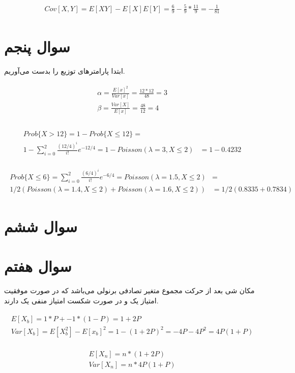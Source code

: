 \documentclass[paper=a4, fontsize=11pt]{article}
\numberwithin{equation}{section} %
\numberwithin{figure}{section} %
\numberwithin{table}{section} %
\begin{document}
\begin{align}
\begin{split}
    Cov[X,Y] = E[XY] - E[X]E[Y] = \frac{6}{9} - \frac{5}{9} * \frac{11}{9} = -\frac{1}{81}
\end{split}
\end{align}

\section{سوال پنجم}
ابتدا پارامتر‌های توزیع را بدست می‌آوریم.

\begin{align}
\begin{split}
    \alpha = \frac{E[x]^2}{Var[x]} = \frac{12 * 12}{48} = 3\\
    \beta = \frac{Var[X]}{E[x]} = \frac{48}{12} = 4\\
\end{split}
\end{align}

\begin{align}
\begin{split}
    Prob\{X > 12\} = 1 - Prob\{X \le 12\} =&\\
    1 - \sum_{i=0}^{2} \frac{(12/4)^i}{i!} e^{-12/4} = 1 - Poisson(\lambda = 3, X \le 2)
    &= 1 - 0.4232
\end{split}
\end{align}

\begin{align}
\begin{split}
    Prob\{X \le 6\} = \sum_{i=0}^{2} \frac{(6/4)^i}{i!} e^{-6/4} = Poisson(\lambda = 1.5, X \le 2) &=\\
    1/2 (Poisson(\lambda = 1.4, X \le 2) + Poisson(\lambda = 1.6, X \le 2)) &= 1/2(0.8335 + 0.7834)
\end{split}
\end{align}

\section{سوال ششم}

\section{سوال هفتم}

مکان شی بعد از 
حرکت مجموع 
متغیر تصادفی برنولی می‌باشد که
در صورت موفقیت امتیاز یک و در صورت شکست امتیاز منفی یک دارند.

\begin{align}
\begin{split}
    E[X_b] = 1 * P + -1 * (1 - P) =  1 + 2P\\
    Var[X_b] = E[X_b^2] - E[x_b]^2 = 1 - (1 + 2P)^2 = -4P - 4P^2 = 4P(1 + P)
\end{split}
\end{align}

\begin{align}
\begin{split}
    E[X_n] = n * (1 + 2P) \\
    Var[X_n] = n * 4P(1 + P)
\end{split}
\end{align}
\end{document}
